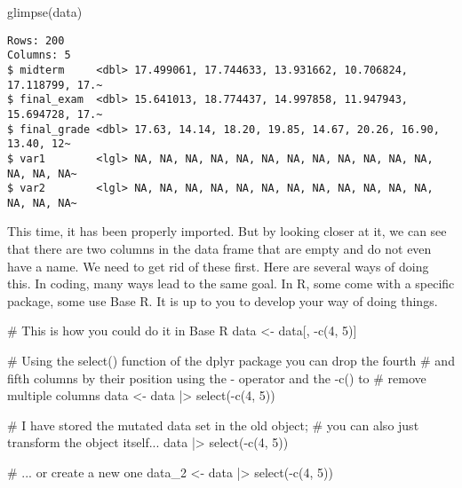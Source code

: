 \documentclass[
  letterpaper,
  DIV=11,
  numbers=noendperiod]{scrreprt}
\newenvironment{Shaded}{\begin{snugshade}}{\end{snugshade}}
\newcommand{\CommentTok}[1]{\textcolor[rgb]{0.37,0.37,0.37}{#1}}
\newcommand{\DecValTok}[1]{\textcolor[rgb]{0.68,0.00,0.00}{#1}}
\newcommand{\FunctionTok}[1]{\textcolor[rgb]{0.28,0.35,0.67}{#1}}
\newcommand{\NormalTok}[1]{\textcolor[rgb]{0.00,0.23,0.31}{#1}}
\newcommand{\OtherTok}[1]{\textcolor[rgb]{0.00,0.23,0.31}{#1}}
\newcommand{\SpecialCharTok}[1]{\textcolor[rgb]{0.37,0.37,0.37}{#1}}
\begin{document}
\begin{Shaded}
\begin{Highlighting}[]
\FunctionTok{glimpse}\NormalTok{(data)}
\end{Highlighting}
\end{Shaded}

\begin{verbatim}
Rows: 200
Columns: 5
$ midterm     <dbl> 17.499061, 17.744633, 13.931662, 10.706824, 17.118799, 17.~
$ final_exam  <dbl> 15.641013, 18.774437, 14.997858, 11.947943, 15.694728, 17.~
$ final_grade <dbl> 17.63, 14.14, 18.20, 19.85, 14.67, 20.26, 16.90, 13.40, 12~
$ var1        <lgl> NA, NA, NA, NA, NA, NA, NA, NA, NA, NA, NA, NA, NA, NA, NA~
$ var2        <lgl> NA, NA, NA, NA, NA, NA, NA, NA, NA, NA, NA, NA, NA, NA, NA~
\end{verbatim}

This time, it has been properly imported. But by looking closer at it,
we can see that there are two columns in the data frame that are empty
and do not even have a name. We need to get rid of these first. Here are
several ways of doing this. In coding, many ways lead to the same goal.
In R, some come with a specific package, some use Base R. It is up to
you to develop your way of doing things.

\begin{Shaded}
\begin{Highlighting}[]
\CommentTok{\# This is how you could do it in Base R}
\NormalTok{data }\OtherTok{\textless{}{-}}\NormalTok{ data[, }\SpecialCharTok{{-}}\FunctionTok{c}\NormalTok{(}\DecValTok{4}\NormalTok{, }\DecValTok{5}\NormalTok{)]}

\CommentTok{\# Using the select() function of the dplyr package you can drop the fourth}
\CommentTok{\# and fifth columns by their position using the {-} operator and the {-}c() to}
\CommentTok{\# remove multiple columns}
\NormalTok{data }\OtherTok{\textless{}{-}}\NormalTok{ data  }\SpecialCharTok{|\textgreater{}}  \FunctionTok{select}\NormalTok{(}\SpecialCharTok{{-}}\FunctionTok{c}\NormalTok{(}\DecValTok{4}\NormalTok{, }\DecValTok{5}\NormalTok{))}

\CommentTok{\# I have stored the mutated data set in the old object; }
\CommentTok{\# you can also just transform the object itself...}
\NormalTok{data }\SpecialCharTok{|\textgreater{}} \FunctionTok{select}\NormalTok{(}\SpecialCharTok{{-}}\FunctionTok{c}\NormalTok{(}\DecValTok{4}\NormalTok{, }\DecValTok{5}\NormalTok{))}

\CommentTok{\# ... or create a new one}
\NormalTok{data\_2 }\OtherTok{\textless{}{-}}\NormalTok{ data }\SpecialCharTok{|\textgreater{}} \FunctionTok{select}\NormalTok{(}\SpecialCharTok{{-}}\FunctionTok{c}\NormalTok{(}\DecValTok{4}\NormalTok{, }\DecValTok{5}\NormalTok{))}
\end{Highlighting}
\end{Shaded}
\end{document}
